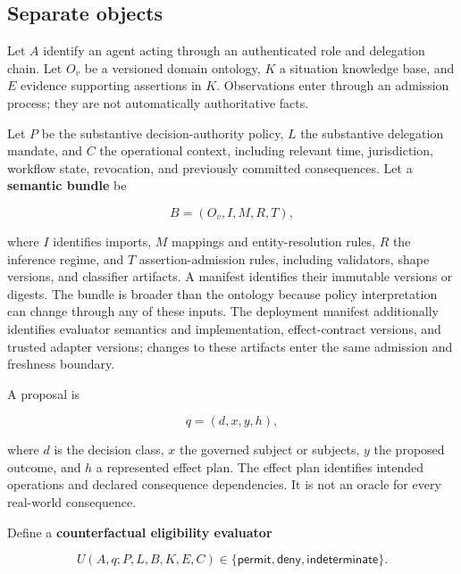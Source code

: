 \documentclass[
  english,
  12pt,
  a4paper,
  preprint,
  numbers,
  nopreprintline]{elsarticle}
\begin{document}
\subsection{Separate objects}\label{separate-objects}

Let \(A\) identify an agent acting through an authenticated role and
delegation chain. Let \(O_v\) be a versioned domain ontology, \(K\) a
situation knowledge base, and \(E\) evidence supporting assertions in
\(K\). Observations enter through an admission process; they are not
automatically authoritative facts.

Let \(P\) be the substantive decision-authority policy, \(L\) the
substantive delegation mandate, and \(C\) the operational context,
including relevant time, jurisdiction, workflow state, revocation, and
previously committed consequences. Let a \textbf{semantic bundle} be

\[ B = (O_v, I, M, R, T), \]

where \(I\) identifies imports, \(M\) mappings and entity-resolution
rules, \(R\) the inference regime, and \(T\) assertion-admission rules,
including validators, shape versions, and classifier artifacts. A
manifest identifies their immutable versions or digests. The bundle is
broader than the ontology because policy interpretation can change
through any of these inputs. The deployment manifest additionally
identifies evaluator semantics and implementation, effect-contract
versions, and trusted adapter versions; changes to these artifacts enter
the same admission and freshness boundary.

A proposal is

\[ q = (d,x,y,h), \]

where \(d\) is the decision class, \(x\) the governed subject or
subjects, \(y\) the proposed outcome, and \(h\) a represented effect
plan. The effect plan identifies intended operations and declared
consequence dependencies. It is not an oracle for every real-world
consequence.

Define a \textbf{counterfactual eligibility evaluator}\nopagebreak[4]

\[ U(A,q;P,L,B,K,E,C) \in \{\mathsf{permit},\mathsf{deny},\mathsf{indeterminate}\}. \]
\end{document}
